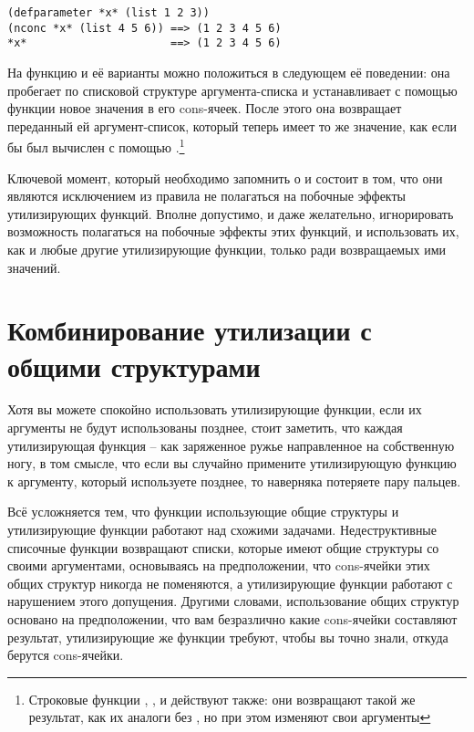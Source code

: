 \begin{lstlisting}
(defparameter *x* (list 1 2 3))
(nconc *x* (list 4 5 6)) ==> (1 2 3 4 5 6)
*x*                      ==> (1 2 3 4 5 6)
\end{lstlisting}

На функцию  и её варианты можно положиться в следующем её поведении: она
пробегает по списковой структуре аргумента-списка и устанавливает с помощью функции
 новое значения в  его cons-ячеек. После этого она возвращает
переданный ей аргумент-список, который теперь имеет то же значение, как если бы был
вычислен с помощью .\footnote{Строковые функции
  , , и  действуют
  также: они возвращают такой же результат, как их аналоги без , но при этом
  изменяют свои аргументы}

Ключевой момент, который необходимо запомнить о  и  состоит
в том, что они являются исключением из правила не полагаться на побочные эффекты
утилизирующих функций. Вполне допустимо, и даже желательно, игнорировать возможность
полагаться на побочные эффекты этих функций, и использовать их, как и любые другие
утилизирующие функции, только ради возвращаемых ими значений.

\section{Комбинирование утилизации с общими структурами}

Хотя вы можете спокойно использовать утилизирующие функции, если их аргументы не будут
использованы позднее, стоит заметить, что каждая утилизирующая функция -- как заряженное
ружье направленное на собственную ногу, в том смысле, что если вы случайно примените
утилизирующую функцию к аргументу, который используете позднее, то наверняка потеряете
пару пальцев.

Всё усложняется тем, что функции использующие общие структуры и утилизирующие функции
работают над схожими задачами. Недеструктивные списочные функции возвращают списки,
которые имеют общие структуры со своими аргументами, основываясь на предположении, что
cons-ячейки этих общих структур никогда не поменяются, а утилизирующие функции работают с
нарушением этого допущения. Другими словами, использование общих структур основано на
предположении, что вам безразлично какие cons-ячейки составляют результат, утилизирующие
же функции требуют, чтобы вы точно знали, откуда берутся cons-ячейки.

